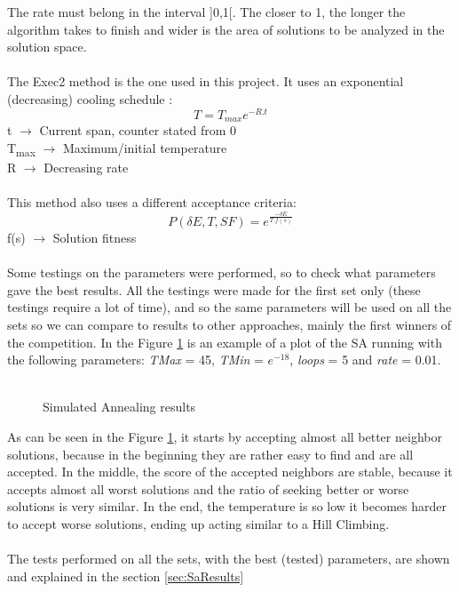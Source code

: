 The rate must belong in the interval ]0,1[. The closer to 1, the longer the algorithm takes to finish and wider is the area of solutions to be analyzed in the solution space.\\
\\
The Exec2 method is the one used in this project. It uses an exponential (decreasing) cooling schedule \cite{CarvalhoLisbonNovember2004}:\\
\[T = T_{max}e^{-R.t} \]
t $\rightarrow$ Current span, counter stated from 0\\
T\textsubscript{max} $\rightarrow$ Maximum/initial temperature\\
R $\rightarrow$ Decreasing rate\\
\\
This method also uses a different acceptance criteria:\\
\[P(\delta E, T, SF) = e^{\frac{-\delta E}{T.f(s)}} \]
f(s) $\rightarrow$ Solution fitness\\
\\
Some testings on the parameters were performed, so to check what parameters gave the best results. All the testings were made for the first set only (these testings require a lot of time), and so the same parameters will be used on all the sets so we can compare to results to other approaches, mainly the first winners of the competition. 
In the Figure \ref{fig:SimulatedAnnealingPlot} is an example of a plot of the SA running with the following parameters: \textit{TMax} = 45, \textit{TMin} = $e^{-18}$, \textit{loops} = 5 and \textit{rate} = 0.01.\\
\\
\begin{figure}[!b]
\centering


\caption{Simulated Annealing results} 
\label{fig:SimulatedAnnealingPlot}
\end{figure}
As can be seen in the Figure \ref{fig:SimulatedAnnealingPlot}, it starts by accepting almost all better neighbor solutions, because in the beginning they are rather easy to find and are all accepted. In the middle, the score of the accepted neighbors are stable, because it accepts almost all worst solutions and the ratio of seeking better or worse solutions is very similar. In the end, the temperature is so low it becomes harder to accept worse solutions, ending up acting similar to a Hill Climbing.\\
\\
The tests performed on all the sets, with the best (tested) parameters, are shown and explained in the section \ref{sec:SaResults}

